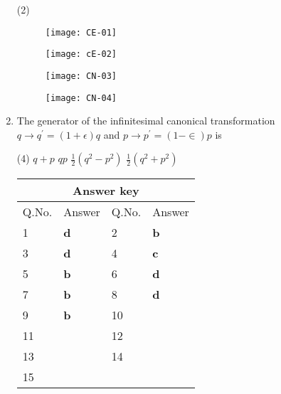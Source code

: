 \begin{enumerate}
	 \begin{tasks}(2)
		\task[\textbf{a.}]
		\begin{figure}[H]
			\centering
			\texttt{[image: CE-01]}
		\end{figure}
		\task[\textbf{b.}]	\begin{figure}[H]
			\centering
			\texttt{[image: cE-02]}
		\end{figure}
		\task[\textbf{c.}]
		\begin{figure}[H]
			\centering
			\texttt{[image: CN-03]}
		\end{figure}
		\task[\textbf{d.}] \begin{figure}[H]
			\centering
			\texttt{[image: CN-04]}
		\end{figure}
	\end{tasks}
	\item  The generator of the infinitesimal canonical transformation $q \rightarrow q^{\prime}=(1+\epsilon) q$ and $p \rightarrow p^{\prime}=(1-\in) p$ is
{}
	 \begin{tasks}(4)
		\task[\textbf{a.}] $q+p$
		\task[\textbf{b.}]$q p$
		\task[\textbf{c.}]$\frac{1}{2}\left(q^{2}-p^{2}\right)$
		\task[\textbf{d.}] $\frac{1}{2}\left(q^{2}+p^{2}\right)$
	\end{tasks}
	\setlength\arrayrulewidth{1pt}
	\begin{table}[H]
		\centering
		\begin{tabular}{|p{1.5cm}|p{1.5cm}||p{1.5cm}|p{1.5cm}|}
			\hline
			\multicolumn{4}{|c|}{\textbf{Answer key}}\\\hline\hline
			\rowcolor{ocrel}Q.No.&Answer&Q.No.&Answer\\\hline
			1&\textbf{d} &2&\textbf{b}\\\hline 
			3&\textbf{d} &4&\textbf{c} \\\hline
			5&\textbf{b} &6&\textbf{d} \\\hline
			7&\textbf{b}&8&\textbf{d}\\\hline
			9&\textbf{b}&10&\textbf{}\\\hline
			11&\textbf{} &12&\textbf{}\\\hline
			13&\textbf{}&14&\textbf{}\\\hline
			15&\textbf{}& &\\\hline
			
		\end{tabular}
	\end{table}
\end{enumerate}
